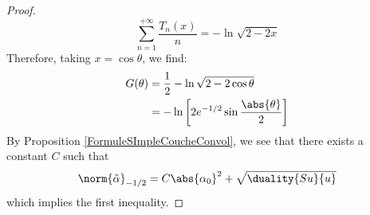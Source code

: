 \documentclass[11pt,a4paper]{article}
\begin{document}
\begin{proof}
\begin{equation*}
				\sum_{n=1}^{+\infty} \frac{T_n(x)}{n} = -\ln\sqrt{2 - 2x}
			\end{equation*}		
			Therefore, taking $x = \cos\theta$, we find:
			\begin{align*}
				G(\theta) &= \frac{1}{2} - \ln\sqrt{2 - 2\cos\theta}\\
				&= -\ln \left[2e^{-1/2}\sin\frac{\abs{\theta}}{2}\right]
			\end{align*}
			By Proposition \ref{FormuleSImpleCoucheConvol}, we see that there exists a constant $C$ such that 
			\begin{equation}
				\norm{\tilde{\alpha}}_{-1/2} = C \abs{\alpha_0}^2 + \sqrt{\duality{Su}{u}}
			\end{equation}
			which implies the first inequality. 
	\end{proof}
	
	
	
	
\end{document}
